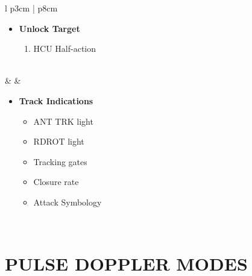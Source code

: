 \documentclass[fontHelvetica, widesubsec]{TechCheck}
\begin{document}
\begin{center}
\begin{longtable}{l p{3cm} | p{8cm}}
\begin{minipage}[t]{\linewidth}
\begin{itemize}
					\item \textbf{Unlock Target}
					\begin{enumerate}[label=(\alph*), resume]
						\item HCU Half-action
					\end{enumerate}
				\end{itemize}
			\end{minipage} \\
			\midrule
			\textbf{\textbullet} &  &
			\begin{minipage}[t]{\linewidth}
				\vspace{-7pt}
				\begin{itemize}
					\item \textbf{Track Indications}
					\begin{itemize}
						\item ANT TRK light
						\item RDROT light
						\item Tracking gates
						\item Closure rate
						\item Attack Symbology
					\end{itemize}
				\end{itemize}
			\end{minipage} \\
			\bottomrule
		\end{longtable}
	\end{center}

	\clearpage

	\section{PULSE DOPPLER MODES}
\end{document}
